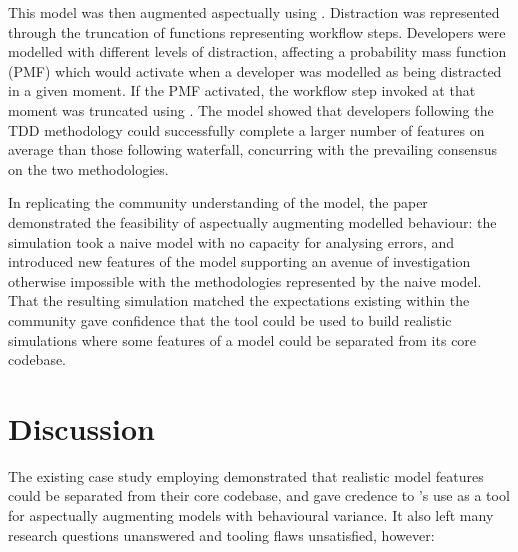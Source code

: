 This model was then augmented aspectually using \pdsf. Distraction was
represented through the truncation of functions representing workflow steps.
Developers were modelled with different levels of distraction, affecting a
probability mass function (PMF) which would activate when a developer was
modelled as being distracted in a given moment. If the PMF activated, the
workflow step invoked at that moment was truncated using \pdsf. The model showed
that developers following the TDD methodology could successfully complete a
larger number of features on average than those following waterfall, concurring
with the prevailing consensus on the two methodologies.

In replicating the community understanding of the model, the paper demonstrated
the feasibility of aspectually augmenting modelled behaviour: the simulation
took a naive model with no capacity for analysing errors, and introduced new
features of the model supporting an avenue of investigation otherwise
impossible with the methodologies represented by the naive model. That the
resulting simulation matched the expectations existing within the community gave
confidence that the tool could be used to build realistic simulations where
some features of a model could be separated from its core codebase.

\section{Discussion}\label{sec:prior_work_discussion}

The existing case study employing \pdsf demonstrated that realistic model
features could be separated from their core codebase, and gave credence to
\pdsf{}'s use as a tool for aspectually augmenting models with behavioural
variance. It also left many research questions unanswered and tooling
flaws unsatisfied, however:

